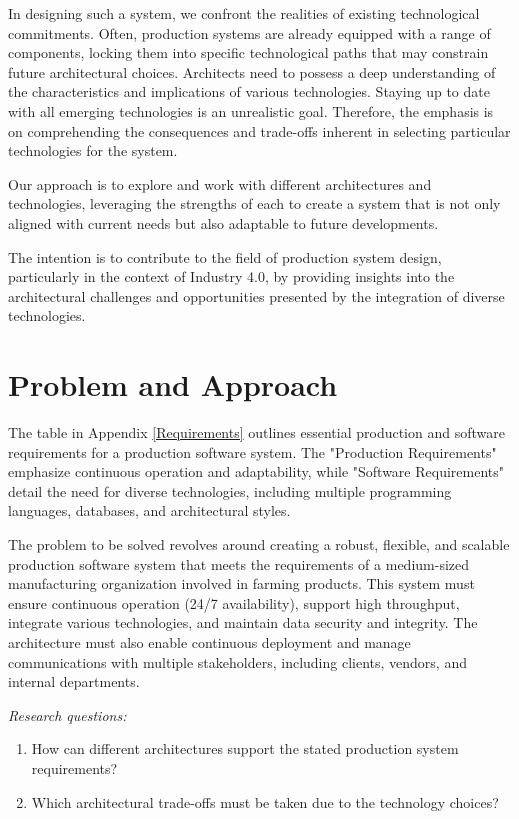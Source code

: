 \documentclass[conference]{IEEEtran}
\begin{document}
In designing such a system, we confront the realities of existing technological commitments. Often, production systems are already equipped with a range of components, locking them into specific technological paths that may constrain future architectural choices. Architects need to possess a deep understanding of the characteristics and implications of various technologies. Staying up to date with all emerging technologies is an unrealistic goal. Therefore, the emphasis is on comprehending the consequences and trade-offs inherent in selecting particular technologies for the system.

Our approach is to explore and work with different architectures and technologies, leveraging the strengths of each to create a system that is not only aligned with current needs but also adaptable to future developments. 

The intention is to contribute to the field of production system design, particularly in the context of Industry 4.0, by providing insights into the architectural challenges and opportunities presented by the integration of diverse technologies. 
  

\section{Problem and Approach}

\label{sec:problem}
The table in Appendix \ref{Requirements} outlines essential production and software requirements for a production software system. The "Production Requirements" emphasize continuous operation and adaptability, while "Software Requirements" detail the need for diverse technologies, including multiple programming languages, databases, and architectural styles. 

The problem to be solved revolves around creating a robust, flexible, and scalable production software system that meets the requirements of a medium-sized manufacturing organization involved in farming products. This system must ensure continuous operation (24/7 availability), support high throughput, integrate various technologies, and maintain data security and integrity. The architecture must also enable continuous deployment and manage communications with multiple stakeholders, including clients, vendors, and internal departments.

\emph{Research questions:}
\begin{enumerate}
    \item How can different architectures support the stated production system requirements?
    \item Which architectural trade-offs must be taken due to the technology choices?
\end{enumerate}
\end{document}
